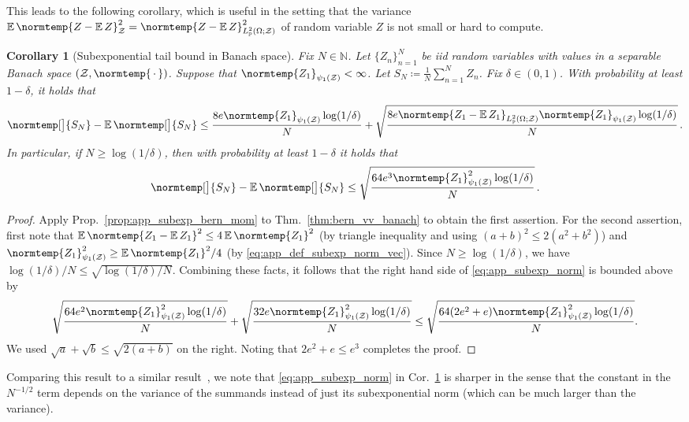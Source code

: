 \documentclass{article}
\theoremstyle{plain}
\newtheorem{corollary}[theorem]{Corollary}
\theoremstyle{my_def}
\theoremstyle{my_rem}
\numberwithin{equation}{section}
\numberwithin{theorem}{section}%
\newcommand{\E}{\mathbb{E}}
\newcommand{\N}{\mathbb{N}}
\renewcommand{\P}{\mathbb{P}}
\newcommand{\cZ}{\mathcal{Z}}
\newcommand{\norm}{\normtemp}
\newcommand{\slot}{{\,\cdot\,}}
\newcommand{\defeq}{\coloneqq} %
\renewcommand{\E}{\operatorname{\mathbb{E}}} %
\begin{document}
This leads to the following corollary, which is useful in the setting that the variance $\E\norm{Z-\E Z}^2_{\cZ}=\norm{Z-\E Z}^2_{L^2_\P(\Omega;\cZ)}$ of random variable $Z$ is not small or hard to compute.
\begin{corollary}[Subexponential tail bound in Banach space]\label{cor:app_subexp_norm}
    Fix $N\in\N$. Let $\{Z_n\}_{n=1}^N$ be iid random variables with values in a separable Banach space $(\cZ,\norm{\slot})$. Suppose that $\norm{Z_1}_{\psi_1(\cZ)}<\infty$.  Let $S_N\defeq \frac{1}{N}\sum_{n=1}^NZ_n$. Fix $\delta\in(0,1)$. With probability at least $1-\delta$, it holds that
    \begin{equation}\label{eq:app_subexp_norm}
        \norm[\big]{S_N}-\E\norm[\big]{S_N}\leq
         \frac{8e\norm{Z_1}_{\psi_1(\cZ)}\log(1/\delta)}{N}
         + \sqrt{\frac{8e\norm{Z_1-\E Z_1}_{L^2_\P(\Omega;\cZ)}\norm{Z_1}_{\psi_1(\cZ)}\log(1/\delta)}{N}}\,.
    \end{equation}
    In particular, if $N\geq \log(1/\delta)$, then with probability at least $1-\delta$ it holds that
    \begin{equation}\label{eq:app_subexp_norm_simple}
        \norm[\big]{S_N}-\E\norm[\big]{S_N}\leq \sqrt{\frac{64e^3\norm{Z_1}^2_{\psi_1(\cZ)}\log(1/\delta)}{N}}\,.
    \end{equation}
\end{corollary}
\begin{proof}
    Apply Prop.~\ref{prop:app_subexp_bern_mom} to Thm.~\ref{thm:bern_vv_banach} to obtain the first assertion. For the second assertion, first note that $\E\norm{Z_1-\E Z_1}^2\leq 4\E\norm{Z_1}^2$ (by triangle inequality and using $(a+b)^2\leq 2(a^2+b^2)$) and $\norm{Z_1}_{\psi_1(\cZ)}^2\geq \E\norm{Z_1}^2/4$ (by \eqref{eq:app_def_subexp_norm_vec}). Since $N\geq \log(1/\delta)$, we have $\log(1/\delta)/N\leq \sqrt{\log(1/\delta)/N}$. Combining these facts, it follows that the right hand side of \eqref{eq:app_subexp_norm} is bounded above by
    \begin{align*}
        \sqrt{\frac{64e^2\norm{Z_1}^2_{\psi_1(\cZ)}\log(1/\delta)}{N}} + \sqrt{\frac{32e\norm{Z_1}^2_{\psi_1(\cZ)}\log(1/\delta)}{N}}\leq \sqrt{\frac{64(2e^2 + e)\norm{Z_1}^2_{\psi_1(\cZ)}\log(1/\delta)}{N}}.
    \end{align*}
    We used $\sqrt{a}+\sqrt{b}\leq \sqrt{2(a+b)}$ on the right. Noting that $2e^2 + e\leq e^3$ completes the proof.
\end{proof}
Comparing this result to a similar result~\cite[Prop. 7(i), pp. 4--5, the iid case]{maurer2021concentration}, we note that \eqref{eq:app_subexp_norm} in Cor.~\ref{cor:app_subexp_norm} is sharper in the sense that the constant in the $N^{-1/2}$ term depends on the variance of the summands instead of just its subexponential norm (which can be much larger than the variance).
\end{document}
